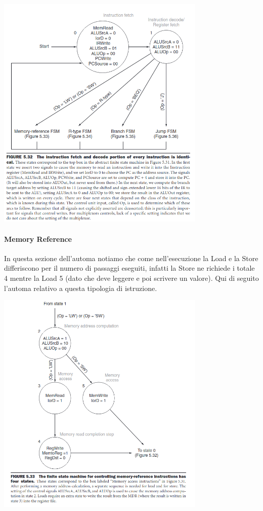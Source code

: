 \documentclass[12pt, a4paper, openany]{book}
\begin{document}
\begin{center}
    \includegraphics[width=100mm, scale=0.5]{FSM Automa Datapath.png}
\end{center}

\paragraph*{Memory Reference}
In questa sezione dell'automa notiamo che come nell'esecuzione la Load e la Store differiscono
per il numero di passaggi eseguiti, infatti la Store ne richiede i totale 4 mentre la Load 5 (dato che
deve leggere e poi scrivere un valore).
Qui di seguito l'automa relativo a questa tipologia di istruzione.

\begin{center}
    \includegraphics[width=100mm, scale=0.5]{MemRef Automa.png}
\end{center}
\end{document}
